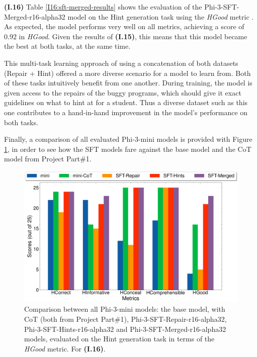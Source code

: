 \documentclass{article}
\begin{document}

\textbf{(I.16)} Table \ref{I16:sft-merged-results} shows the evaluation of the Phi-3-SFT-Merged-r16-alpha32 model on the Hint generation task using the \emph{HGood} metric \cite{HintsInBrowser2024}. As expected, the model performs very well on all metrics, achieving a score of $0.92$ in \emph{HGood}. Given the results of \textbf{(I.15)}, this means that this model became the best at both tasks, at the same time.

This multi-task learning approach of using a concatenation of both datasets (Repair + Hint) offered a more diverse scenario for a model to learn from. Both of these tasks intuitively benefit from one another. During training, the model is given access to the repairs of the buggy programs, which should give it exact guidelines on what to hint at for a student. Thus a diverse dataset such as this one contributes to a hand-in-hand improvement in the model's performance on both tasks.

Finally, a comparison of all evaluated Phi-3-mini models is provided with Figure \ref{fig:I.16-results}, in order to see how the SFT models fare against the base model and the CoT model from Project Part\#1.

\begin{figure}[h]
    \centering
    \includegraphics[width=0.9\linewidth]{../images/all_models_hint_metrics_plot.pdf}
    \caption{Comparison between all Phi-3-mini models: the base model, with CoT (both from Project Part\#1), Phi-3-SFT-Repair-r16-alpha32, Phi-3-SFT-Hints-r16-alpha32 and Phi-3-SFT-Merged-r16-alpha32 models, evaluated on the Hint generation task in terms of the \emph{HGood} metric. For \textbf{(I.16)}.}
    \label{fig:I.16-results}
\end{figure}
\end{document}

